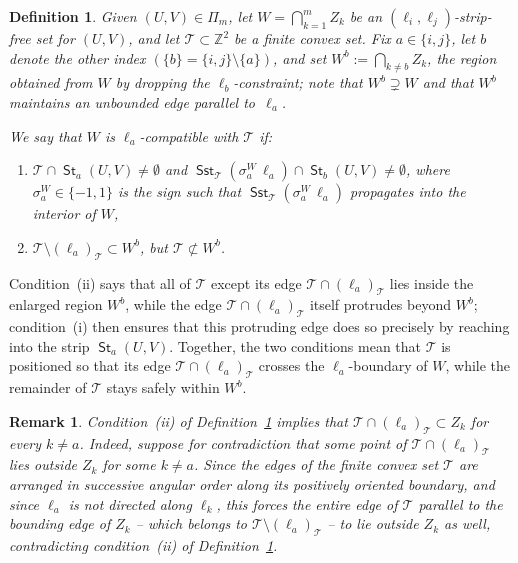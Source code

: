 \documentclass[12pt]{amsart}
\numberwithin{equation}{section}
\newtheorem{definition}[theorem]{Definition}
\newtheorem{remark}[theorem]{Remark}
\DeclareMathOperator{\st}{\mathsf{St}}
\DeclareMathOperator{\sst}{\mathsf{Sst}}
\newcommand{\bb}[1]{\mathbb{#1}}
\begin{document}
\begin{definition}\label{def:compatible}
Given $(U,V) \in \Pi_m$, let $ W = \bigcap_{k=1}^m Z_k $ be an $(\pmb{\ell}_{i},\pmb{\ell}_{j})$-strip-free set for $(U,V)$, and let $\mathcal{T} \subset \bb{Z}^2$ be a finite convex set. Fix $a \in \{i, j\}$, let $b$ denote the other index $(\{b\} = \{i, j\} \setminus \{a\})$, and set $ W^b := \bigcap_{k \ne b} Z_k$, the region obtained from $W$ by dropping the $\ell_b$-constraint; note that $ W^b \supsetneq W $ and that $ W^b $ maintains an unbounded edge parallel to~$\pmb{\ell}_a$.

We say that $W$ is \emph{$\pmb{\ell}_a$-compatible} with $\mathcal T$ if:
\begin{enumerate}[label=(\roman*)]\setlength{\itemsep}{5pt}

    \item $\mathcal{T} \cap \st_{a}(U,V) \neq \emptyset$ and $\sst_{\mathcal{T}}(\sigma^W_a\,\pmb{\ell}_a) \cap \st_{b}(U,V) \neq \emptyset$, where $\sigma^W_a \in \{-1,1\}$ is the sign such that $\sst_{\mathcal{T}}(\sigma^W_a\,\pmb{\ell}_a)$ propagates into the interior of $W$,
	
	\item $\mathcal{T} \setminus (\pmb{\ell}_a)_{\mathcal{T}} \subset W^b$, but $\mathcal{T}  \not\subset W^b$.
\end{enumerate} 
\end{definition}

Condition~(ii) says that all of $\mathcal T$ except its edge $\mathcal{T} \cap (\pmb{\ell}_a)_{\mathcal{T}}$ lies inside the enlarged region $ W^b $, while the edge $\mathcal{T} \cap (\pmb{\ell}_a)_{\mathcal{T}}$ itself protrudes beyond $W^b$; condition~(i) then ensures that this protruding edge does so precisely by reaching into the strip $ \st_a(U, V)$. Together, the two conditions mean that $ \mathcal T $ is positioned so that its edge $\mathcal{T} \cap (\pmb{\ell}_a)_{\mathcal{T}}$ crosses the $\ell_a$-boundary of $ W $, while the remainder of $\mathcal T $ stays safely within $ W^b $.

\begin{remark}\label{rem:edge_inside_halplanes}
Condition~(ii) of Definition~\ref{def:compatible} implies that $\mathcal{T} \cap (\pmb{\ell}_a)_{\mathcal T} \subset Z_k $ for every $ k \neq a $.
Indeed, suppose for contradiction that some point of $\mathcal{T} \cap (\pmb{\ell}_a)_{\mathcal T}$ lies outside $ Z_k $ for some $ k \neq a $. Since the edges of the finite convex set $ \mathcal T $ are arranged in successive angular order along its positively oriented boundary, and since $ \pmb{\ell}_a $ is not directed along $ \ell_k $, this forces the entire edge of $ \mathcal T $ parallel to the bounding edge of $ Z_k $ -- which belongs to $ \mathcal T \setminus (\pmb{\ell}_a)_{\mathcal T} $ -- to lie outside $ Z_k $ as well, contradicting condition~(ii) of Definition~\ref{def:compatible}.
\end{remark}
\end{document}
